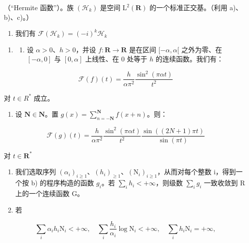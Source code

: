 （“Hermite 函数”）。族 \((\mathcal{H}_{k})\) 是空间 \(\mathrm{L}^{2}(\mathbf{R})\) 的一个标准正交基。（利用 a)、b)、c)。）

\begin{enumerate}
\def\labelenumi{\alph{enumi})}
\setcounter{enumi}{4}
\tightlist
\item
  我们有 \(\mathcal{F}(\mathcal{H}_k) = (-i)^k\mathcal{H}_k\)
\end{enumerate}

\begin{enumerate}
\def\labelenumi{\arabic{enumi})}
\setcounter{enumi}{3}
\tightlist
\item
  \begin{enumerate}
  \def\labelenumii{\alph{enumii})}
  \tightlist
  \item
    设 \(\alpha > 0\)、\(h > 0\)，并设 \(f: \mathbf{R} \to \mathbf{R}\) 是在区间 \([- \alpha, \alpha[\) 之外为零、在 \([- \alpha, 0]\) 与 \([0, \alpha]\) 上线性、在 0 处等于 \(h\) 的连续函数。我们有：
  \end{enumerate}
\end{enumerate}

\[
\mathcal {F} (f) (t) = \frac {h}{\alpha \pi^ {2}} \frac {\sin^ {2} (\pi \alpha t)}{t ^ {2}}
\]

对 \(t \in R^{*}\) 成立。

\begin{enumerate}
\def\labelenumi{\alph{enumi})}
\setcounter{enumi}{1}
\tightlist
\item
  设 \(\mathbf{N} \in \mathbf{N}\)。置 \(g(x) = \sum_{n=-\mathbf{N}}^{\mathbf{N}} f(x + n)\)。则：
\end{enumerate}

\[
\mathcal {F} (g) (t) = \frac {h}{\alpha \pi^ {2}} \frac {\sin^ {2} (\pi \alpha t)}{t ^ {2}} \frac {\sin ((2 N + 1) \pi t)}{\sin (\pi t)}
\]

对 \(t\in \mathbf{R}^*\)

\begin{enumerate}
\def\labelenumi{\alph{enumi})}
\setcounter{enumi}{2}
\item
  我们选取序列 \((\alpha_{i})_{i\geqslant1}\)、\((h_{i})_{\geqslant1}\)、\((\mathrm{N}_{i})_{i\geqslant1}\)，从而对每个整数 i，得到一个按 b) 的程序构造的函数 \(g_{i}\)。若 \(\sum_{i} h_{i} < +\infty\)，则级数 \(\sum_{i} g_{i}\) 一致收敛到 R 上的一个连续函数 G。
\item
  若
\end{enumerate}

\[
\sum_ {i} \alpha_ {i} h _ {i} \mathrm{N} _ {i} <   + \infty , \quad \sum_ {i} \frac {h _ {i}}{\alpha_ {i}} \log \mathrm{N} _ {i} <   + \infty , \quad \sum_ {i} h _ {i} \mathrm{N} _ {i} = + \infty ,
\]

